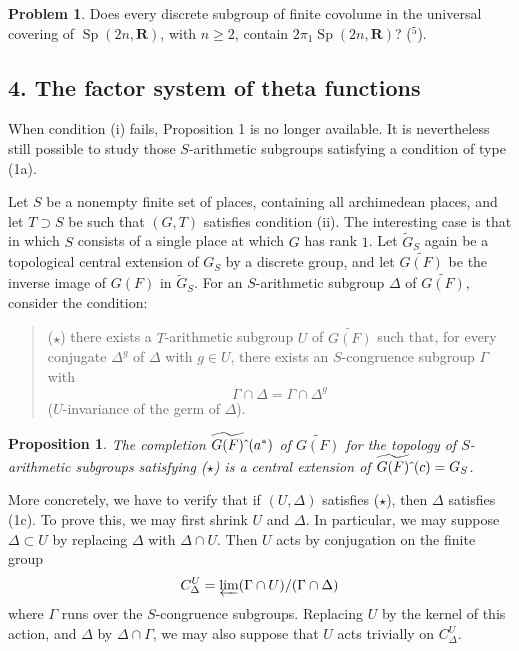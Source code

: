 \documentclass[10pt]{amsart}
\theoremstyle{plain}
\newtheorem{proposition}{Proposition}
\theoremstyle{definition}
\newtheorem{problem}{Problem}
\DeclareMathOperator{\Sp}{Sp}
\begin{document}
\begin{problem}
Does every discrete subgroup of finite covolume in the universal covering of $\Sp(2n,\mathbf R)$, with $n\ge2$, contain $2\pi_1\Sp(2n,\mathbf R)$? ($^5$).
\end{problem}

\subsection*{4. The factor system of theta functions}

When condition (i) fails, Proposition 1 is no longer available. It is nevertheless still possible to study those $S$-arithmetic subgroups satisfying a condition of type (1a).

Let $S$ be a nonempty finite set of places, containing all archimedean places, and let $T\supset S$ be such that $(G,T)$ satisfies condition (ii). The interesting case is that in which $S$ consists of a single place at which $G$ has rank $1$. Let $\widetilde G_S$ again be a topological central extension of $G_S$ by a discrete group, and let $\widetilde{G(F)}$ be the inverse image of $G(F)$ in $\widetilde G_S$. For an $S$-arithmetic subgroup $\Delta$ of $\widetilde{G(F)}$, consider the condition:
\begin{quote}
($\star$) there exists a $T$-arithmetic subgroup $U$ of $\widetilde{G(F)}$ such that, for every conjugate $\Delta^g$ of $\Delta$ with $g\in U$, there exists an $S$-congruence subgroup $\Gamma$ with
\[
\Gamma\cap\Delta=\Gamma\cap\Delta^g
\]
($U$-invariance of the germ of $\Delta$).
\end{quote}

\begin{proposition}
The completion $\widetilde{G(F)}\hat{\mkern6mu}(a^*)$ of $\widetilde{G(F)}$ for the topology of $S$-arithmetic subgroups satisfying ($\star$) is a central extension of $\widetilde{G(F)}\hat{\mkern6mu}(c)=G_S$.
\end{proposition}

More concretely, we have to verify that if $(U,\Delta)$ satisfies ($\star$), then $\Delta$ satisfies (1c). To prove this, we may first shrink $U$ and $\Delta$. In particular, we may suppose $\Delta\subset U$ by replacing $\Delta$ with $\Delta\cap U$. Then $U$ acts by conjugation on the finite group
\[
C^U_\Delta=\varprojlim (\Gamma\cap U)/(\Gamma\cap\Delta)
\]
where $\Gamma$ runs over the $S$-congruence subgroups. Replacing $U$ by the kernel of this action, and $\Delta$ by $\Delta\cap\Gamma$, we may also suppose that $U$ acts trivially on $C^U_\Delta$.
\end{document}

